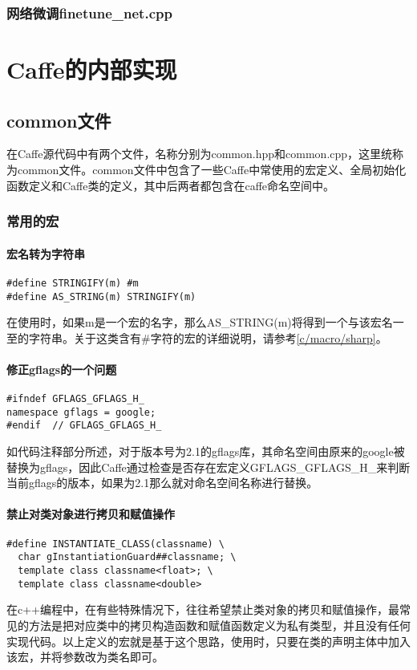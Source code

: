 \documentclass{../CNTeXBookTemplate/NanCNBook}
\begin{document}
\section{网络微调finetune\_net.cpp}

\part{Caffe的内部实现}

\chapter{common文件}
在Caffe源代码中有两个文件，名称分别为common.hpp和common.cpp，这里统称为common文件。common文件中包含了一些Caffe中常使用的宏定义、全局初始化函数定义和Caffe类的定义，其中后两者都包含在caffe命名空间中。
\section{常用的宏}
\subsection{宏名转为字符串}
\begin{verbatim}
#define STRINGIFY(m) #m
#define AS_STRING(m) STRINGIFY(m)
\end{verbatim}
在使用时，如果m是一个宏的名字，那么AS\_STRING(m)将得到一个与该宏名一至的字符串。关于这类含有\#字符的宏的详细说明，请参考\ref{c/macro/sharp}。
\subsection{修正gflags的一个问题}
\begin{verbatim}
#ifndef GFLAGS_GFLAGS_H_
namespace gflags = google;
#endif  // GFLAGS_GFLAGS_H_
\end{verbatim}
如代码注释部分所述，对于版本号为2.1的gflags库，其命名空间由原来的google被替换为gflags，因此Caffe通过检查是否存在宏定义GFLAGS_GFLAGS_H_来判断当前gflags的版本，如果为2.1那么就对命名空间名称进行替换。
\subsection{禁止对类对象进行拷贝和赋值操作}
\begin{verbatim}
#define INSTANTIATE_CLASS(classname) \
  char gInstantiationGuard##classname; \
  template class classname<float>; \
  template class classname<double>
\end{verbatim}
在c++编程中，在有些特殊情况下，往往希望禁止类对象的拷贝和赋值操作，最常见的方法是把对应类中的拷贝构造函数和赋值函数定义为私有类型，并且没有任何实现代码。以上定义的宏就是基于这个思路，使用时，只要在类的声明主体中加入该宏，并将参数改为类名即可。
\end{document}
